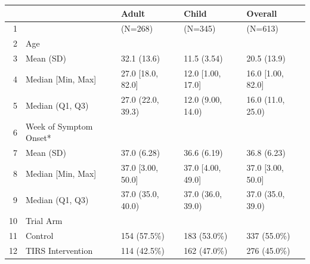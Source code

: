 \begin{table}[ht]
\centering
\begin{tabular}{rllll}
  \hline
 &   & Adult & Child & Overall \\ 
  \hline
1 &  & (N=268) & (N=345) & (N=613) \\ 
  2 & Age &  &  &  \\ 
  3 &   Mean (SD) & 32.1 (13.6) & 11.5 (3.54) & 20.5 (13.9) \\ 
  4 &   Median [Min, Max] & 27.0 [18.0, 82.0] & 12.0 [1.00, 17.0] & 16.0 [1.00, 82.0] \\ 
  5 &   Median (Q1, Q3) & 27.0 (22.0, 39.3) & 12.0 (9.00, 14.0) & 16.0 (11.0, 25.0) \\ 
  6 & Week of Symptom Onset* &  &  &  \\ 
  7 &   Mean (SD) & 37.0 (6.28) & 36.6 (6.19) & 36.8 (6.23) \\ 
  8 &   Median [Min, Max] & 37.0 [3.00, 50.0] & 37.0 [4.00, 49.0] & 37.0 [3.00, 50.0] \\ 
  9 &   Median (Q1, Q3) & 37.0 (35.0, 40.0) & 37.0 (36.0, 39.0) & 37.0 (35.0, 39.0) \\ 
  10 & Trial Arm &  &  &  \\ 
  11 &   Control & 154 (57.5\%) & 183 (53.0\%) & 337 (55.0\%) \\ 
  12 &   TIRS Intervention & 114 (42.5\%) & 162 (47.0\%) & 276 (45.0\%) \\ 
   \hline
\end{tabular}
\end{table}
